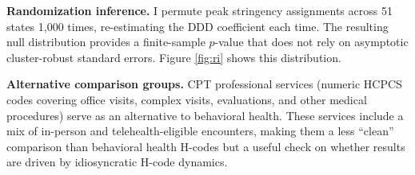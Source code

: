 \documentclass[12pt]{article}
\begin{document}
\textbf{Randomization inference.} I permute peak stringency assignments across 51 states 1,000 times, re-estimating the DDD coefficient each time. The resulting null distribution provides a finite-sample $p$-value that does not rely on asymptotic cluster-robust standard errors. Figure \ref{fig:ri} shows this distribution.

\textbf{Alternative comparison groups.} CPT professional services (numeric HCPCS codes covering office visits, complex visits, evaluations, and other medical procedures) serve as an alternative to behavioral health. These services include a mix of in-person and telehealth-eligible encounters, making them a less ``clean'' comparison than behavioral health H-codes but a useful check on whether results are driven by idiosyncratic H-code dynamics.
\end{document}

